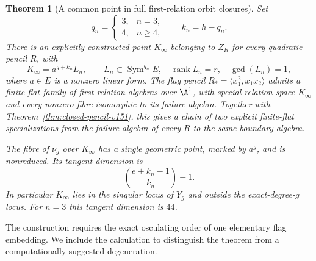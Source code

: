 \documentclass[11pt,reqno]{amsart}
\numberwithin{equation}{section}
\newtheorem{theorem}{Theorem}[section]
\theoremstyle{definition}\newtheorem{definition}[theorem]{Definition}
\theoremstyle{remark}\newtheorem{remark}[theorem]{Remark}
\DeclareMathOperator{\Sym}{Sym}\DeclareMathOperator{\Gr}{Gr}
\DeclareMathOperator{\rank}{rank}\DeclareMathOperator{\Proj}{Proj}
\begin{document}
\begin{theorem}[A common point in full first-relation orbit closures]
\label{thm:universal-boundary-v152}
Set
\[
 q_n=\begin{cases}3,&n=3,\\4,&n\geq4,\end{cases}
 \qquad k_n=h-q_n.
\]
There is an explicitly constructed point $K_\infty$ belonging to
$Z_R$ for every quadratic pencil $R$, with
\begin{equation}\label{eq:boundary-gcd-v152}
 K_\infty=a^{g+k_n}L_n,\qquad
 L_n\subset\Sym^{q_n}E,\quad \rank L_n=r,\quad\gcd(L_n)=1,
\end{equation}
where $a\in E$ is a nonzero linear form.  The flag pencil
$R_*=\langle x_1^2,x_1x_2\rangle$ admits a finite-flat family of
first-relation algebras over $\A^1$, with special relation space
$K_\infty$ and every nonzero fibre isomorphic to its failure algebra.
Together with Theorem~\ref{thm:closed-pencil-v151}, this gives a
chain of two explicit finite-flat specializations from the failure
algebra of every $R$ to the same boundary algebra.

The fibre of $\nu_g$ over $K_\infty$ has a single geometric point,
marked by $a^g$, and is nonreduced.  Its tangent dimension is
\begin{equation}\label{eq:boundary-tangent-v152}
                 \binom{e+k_n-1}{k_n}-1.
\end{equation}
In particular $K_\infty$ lies in the singular locus of $Y_g$ and
outside the exact-degree-$g$ locus.  For $n=3$ this tangent dimension
is $44$.
\end{theorem}

The construction requires the exact osculating order of one elementary
flag embedding.  We include the calculation to distinguish the theorem
from a computationally suggested degeneration.
\end{document}
